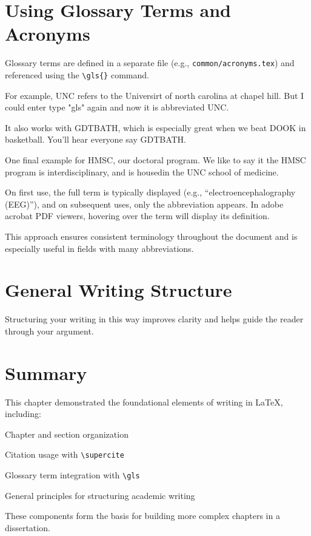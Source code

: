 \section{Using Glossary Terms and Acronyms}

Glossary terms are defined in a separate file (e.g., \texttt{common/acronyms.tex}) and referenced using the \texttt{\textbackslash gls\{\}} command.

For example, \gls{UNC} refers to the Universirt of north carolina at chapel hill. But I could enter type "gls" again and now it is abbreviated \gls{UNC}.

It also works with \gls{GDTBATH}, which is especially great when we beat DOOK in basketball. You'll hear everyone say \gls{GDTBATH}.

One final example for \gls{HMSC}, our doctoral program. We like to say it the \gls{HMSC} program is interdisciplinary, and is housedin the \gls{UNC} school of medicine.

On first use, the full term is typically displayed (e.g., “electroencephalography (EEG)”), and on subsequent uses, only the abbreviation appears. In adobe acrobat PDF viewers, hovering over the term will display its definition.

This approach ensures consistent terminology throughout the document and is especially useful in fields with many abbreviations.

\section{General Writing Structure}

Structuring your writing in this way improves clarity and helps guide the reader through your argument.

\section{Summary}

This chapter demonstrated the foundational elements of writing in \LaTeX{}, including: \begin{inparaenum}[(i)]
    \item Chapter and section organization
    \item Citation usage with \texttt{\textbackslash supercite}
    \item Glossary term integration with \texttt{\textbackslash gls}
    \item General principles for structuring academic writing
\end{inparaenum}

These components form the basis for building more complex chapters in a dissertation.